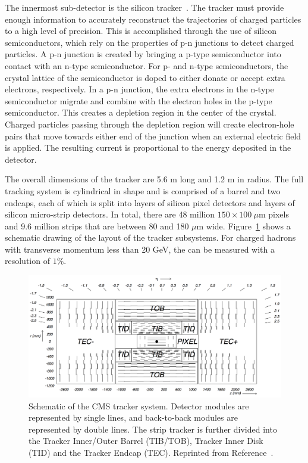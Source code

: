 The innermost sub-detector is the silicon tracker~\cite{trackerTDR,trackerTDRAddendum}. The tracker must provide enough information to accurately reconstruct the trajectories of charged particles to a high level of precision. This is accomplished through the use of silicon semiconductors, which rely on the properties of p-n junctions to detect charged particles. A p-n junction is created by bringing a p-type semiconductor into contact with an n-type semiconductor. For p- and n-type semiconductors, the crystal lattice of the semiconductor is doped to either donate or accept extra electrons, respectively. In a p-n junction, the extra electrons in the n-type semiconductor migrate and combine with the electron holes in the p-type semiconductor. This creates a depletion region in the center of the crystal. Charged particles passing through the depletion region will create electron-hole pairs that move towards either end of the junction when an external electric field is applied. The resulting current is proportional to the energy deposited in the detector.

The overall dimensions of the tracker are 5.6 m long and 1.2 m in radius. The full tracking system is cylindrical in shape and is comprised of a barrel and two endcaps, each of which is split into layers of silicon pixel detectors and layers of silicon micro-strip detectors. In total, there are 48 million $150\times100~\mu$m pixels and 9.6 million strips that are between 80 and 180 $\mu$m wide. Figure~\ref{fig:TrackerLayout} shows a schematic drawing of the layout of the tracker subsystems. For charged hadrons with transverse momentum \pt less than 20 GeV, the \pt can be measured with a resolution of $1\%$. 

\begin{figure}[h!]
	\centering
	\includegraphics[width=\linewidth]{Figures/Detector/tracker_layout.png}
       \caption{Schematic of the CMS tracker system. Detector modules are represented by single lines, and back-to-back modules are represented by double lines. The strip tracker is further divided into the Tracker Inner/Outer Barrel (TIB/TOB), Tracker Inner Disk (TID) and the Tracker Endcap (TEC). Reprinted from Reference~\cite{Chatrchyan2008zzk}.}
   	\label{fig:TrackerLayout}
\end{figure}

